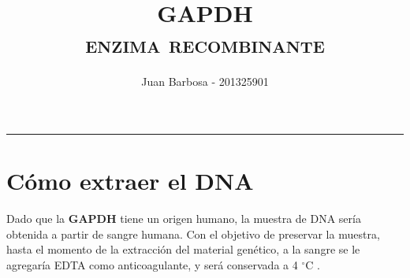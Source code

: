 \documentclass[12pt]{article}
\title{\color{blue} \scshape{GAPDH\\ enzima recombinante}}
\author{Juan Barbosa - 201325901}
\newcommand{\enzima}{\textbf{GAPDH}}
\begin{document}
	\maketitle
	\begin{multicols}{2}
		\footnotesize
		\tableofcontents
	\end{multicols}
	\rule{15cm}{0.4pt}

	\section{C\'omo extraer el DNA}
		Dado que la \enzima{} tiene un origen humano, la muestra de DNA ser\'ia obtenida a partir de sangre humana. Con el objetivo de preservar la muestra, hasta el momento de la extracci\'on del material gen\'etico, a la sangre se le agregar\'ia EDTA como anticoagulante, y ser\'a conservada a 4 $^\circ$C \cite{m2011human, puregeneBook}.
\end{document}
